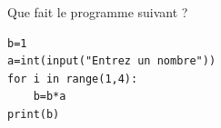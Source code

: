 \begin{exo}{}
	Que fait le programme suivant ?

	\begin{lstlisting}
b=1
a=int(input("Entrez un nombre"))
for i in range(1,4):
    b=b*a
print(b)
\end{lstlisting}
\end{exo}
